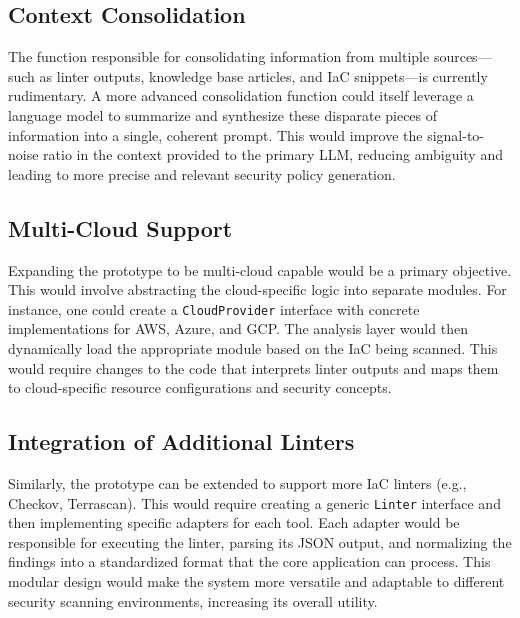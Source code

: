 \subsection{Context Consolidation}
The function responsible for consolidating information from multiple sources—such as linter outputs, knowledge base articles, and IaC snippets—is currently rudimentary. A more advanced consolidation function could itself leverage a language model to summarize and synthesize these disparate pieces of information into a single, coherent prompt. This would improve the signal-to-noise ratio in the context provided to the primary LLM, reducing ambiguity and leading to more precise and relevant security policy generation.

\subsection{Multi-Cloud Support}
Expanding the prototype to be multi-cloud capable would be a primary objective. This would involve abstracting the cloud-specific logic into separate modules. For instance, one could create a \texttt{CloudProvider} interface with concrete implementations for AWS, Azure, and GCP. The analysis layer would then dynamically load the appropriate module based on the IaC being scanned. This would require changes to the code that interprets linter outputs and maps them to cloud-specific resource configurations and security concepts.

\subsection{Integration of Additional Linters}
\label{subsec:future_linters}
Similarly, the prototype can be extended to support more IaC linters (e.g., Checkov, Terrascan). This would require creating a generic \texttt{Linter} interface and then implementing specific adapters for each tool. Each adapter would be responsible for executing the linter, parsing its JSON output, and normalizing the findings into a standardized format that the core application can process. This modular design would make the system more versatile and adaptable to different security scanning environments, increasing its overall utility.